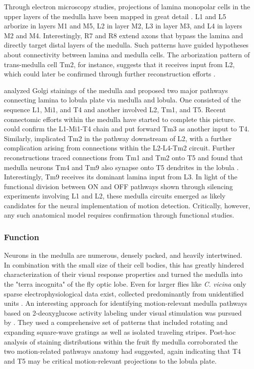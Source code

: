 Through electron microscopy studies, projections of lamina monopolar cells in the upper layers of the medulla have been mapped in great detail \citep{Takemura:2008ee}. L1 and L5 arborize in layers M1 and M5, L2 in layer M2, L3 in layer M3, and L4 in layers M2 and M4. Interestingly, R7 and R8 extend axons that bypass the lamina and directly target distal layers of the medulla. Such patterns have guided hypotheses about connectivity between lamina and medulla cells. The arborization pattern of trans-medulla cell Tm2, for instance, suggests that it receives input from L2, which could later be confirmed through further reconstruction efforts \citep{Takemura:2011iy}.

\citet{Bausenwein:1992vx} analyzed Golgi stainings of the medulla and proposed two major pathways connecting lamina to lobula plate via medulla and lobula. One consisted of the sequence L1, Mi1, and T4 and another involved L2, Tm1, and T5. Recent connectomic efforts within the medulla have started to complete this picture. \citet{Takemura:2013ea} could confirm the L1-Mi1-T4 chain and put forward Tm3 as another input to T4. Similarly, \citet{Takemura:2011iy} implicated Tm2 in the pathway downstream of L2, with a further complication arising from connections within the L2-L4-Tm2 circuit. Further reconstructions traced connections from Tm1 and Tm2 onto T5 and found that medulla neurons Tm4 and Tm9 also synapse onto T5 dendrites in the lobula \citep{Shinomiya:2014dx}. Interestingly, Tm9 receives its dominant lamina input from L3. In light of the functional division between ON and OFF pathways shown through silencing experiments involving L1 and L2, these medulla circuits emerged as likely candidates for the neural implementation of motion detection. Critically, however, any such anatomical model requires confirmation through functional studies.

\subsubsection{Function}
Neurons in the medulla are numerous, densely packed, and heavily intertwined. In combination with the small size of their cell bodies, this has greatly hindered characterization of their visual response properties and turned the medulla into the "terra incognita" of the fly optic lobe. Even for larger flies like \textit{C. vicina} only sparse electrophysiological data exist, collected predominantly from unidentified units \citep{Mimura:1972aa,DeVoe:1980aa,Douglass:1995aa,Douglass:1996aa}. An interesting approach for identifying motion-relevant medulla pathways based on 2-deoxyglucose activity labeling under visual stimulation was pursued by \citet{Bausenwein:1992aa}. They used a comprehensive set of patterns that included rotating and expanding square-wave gratings as well as isolated traveling stripes. Post-hoc analysis of staining distributions within the fruit fly medulla corroborated the two motion-related pathways anatomy had suggested, again indicating that T4 and T5 may be critical motion-relevant projections to the lobula plate.

